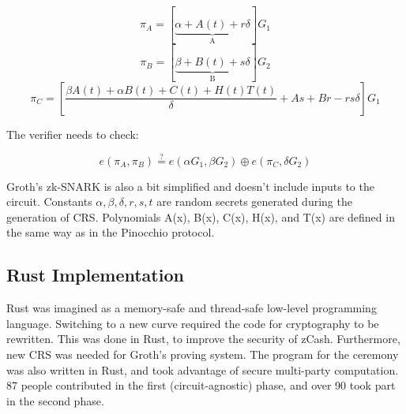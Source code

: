 $$ \pi_A = [\underbrace{\alpha + A(t) + r\delta}_\text{A}]G_1 $$
$$ \pi_B = [\underbrace{\beta + B(t) + s\delta}_\text{B}]G_2 $$
$$ \pi_C = [\frac{\beta A(t) + \alpha B(t) + C(t) + H(t)T(t)}{\delta} + As + Br - rs\delta]G_1 $$

The verifier needs to check:

$$ e(\pi_A, \pi_B) \stackrel{?}{=} e(\alpha G_1, \beta G_2) \oplus e(\pi_C, \delta G_2) $$

Groth's zk-SNARK is also a bit simplified and doesn't include inputs to the circuit. Constants $\alpha, \beta, \delta, r, s, t$ are random secrets generated during the generation of CRS. Polynomials A(x), B(x), C(x), H(x), and T(x) are defined in the same way as in the Pinocchio protocol.

\subsection{Rust Implementation}

Rust was imagined as a memory-safe and thread-safe low-level programming language. Switching to a new curve required the code for cryptography to be rewritten. This was done in Rust, to improve the security of zCash. Furthermore, new CRS was needed for Groth's proving system. The program for the ceremony was also written in Rust, and took advantage of secure multi-party computation. 87 people contributed in the first (circuit-agnostic) phase, and over 90 took part in the second phase.